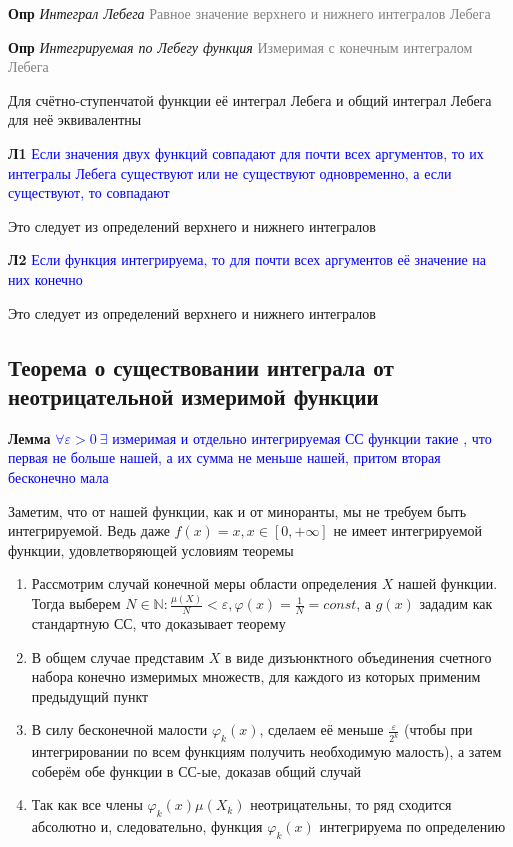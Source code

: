 \textbf{Опр} \textit{Интеграл Лебега} \textcolor{gray}{Равное значение верхнего и нижнего интегралов Лебега}

\textbf{Опр} \textit{Интегрируемая по Лебегу функция} \textcolor{gray}{Измеримая с конечным интегралом Лебега}

Для счётно-ступенчатой функции её интеграл Лебега и общий интеграл Лебега для неё эквивалентны

\textbf{Л1} \textcolor{blue}{Если значения двух функций совпадают для почти всех аргументов, то их интегралы Лебега
существуют или не существуют одновременно, а если существуют, то совпадают}

Это следует из определений верхнего и нижнего интегралов

\textbf{Л2} \textcolor{blue}{Если функция интегрируема, то для почти всех аргументов её значение на них конечно}

Это следует из определений верхнего и нижнего интегралов

\subsection{Теорема о существовании интеграла от неотрицательной измеримой функции}

\textbf{Лемма} \textcolor{blue}{$\forall \varepsilon > 0~\exists$ измеримая и отдельно интегрируемая СС функции такие
    , что первая не больше нашей, а их сумма не меньше нашей, притом вторая бесконечно мала}

Заметим, что от нашей функции, как и от миноранты, мы не требуем быть интегрируемой.
Ведь даже $f(x) = x, x \in [0, +\infty]$ не имеет интегрируемой функции, удовлетворяющей условиям теоремы

\begin{enumerate}
    \item Рассмотрим случай конечной меры области определения $X$ нашей функции.
    Тогда выберем $N \in \mathbb{N}: \frac{\mu(X)}{N} < \varepsilon, \varphi(x) = \frac{1}{N} = const$, а $g(x)$ зададим
    как стандартную СС, что доказывает теорему
    \item В общем случае представим $X$ в виде дизъюнктного объединения счетного набора конечно измеримых
    множеств, для каждого из которых применим предыдущий пункт
    \item В силу бесконечной малости $\varphi_k(x)$, сделаем её меньше $\frac{\varepsilon}{2^k}$ (чтобы при
    интегрировании по всем функциям получить необходимую малость), а затем соберём обе функции в СС-ые, доказав
    общий случай
    \item Так как все члены $\varphi_k(x) \mu (X_k)$ неотрицательны, то ряд сходится абсолютно и, следовательно, функция
    $\varphi_k(x)$ интегрируема по определению
\end{enumerate}

